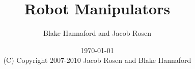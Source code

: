 \documentclass[oneside]{book}
\begin{document}
\setpagewiselinenumbers
\modulolinenumbers[5]

\setcounter{chapter}{0}


 \title{Robot Manipulators}

 \author{Blake Hannaford and Jacob Rosen}

 \date{\today\\(C) Copyright 2007-2010 Jacob Rosen and Blake Hannaford}

 \maketitle

\tableofcontents

\mainmatter

\linenumbers
% 
%
%
%

%  
%  
%  
%  
%  
%  
\setcounter{chapter}{7}
%  
 
% 
%  
% 
% 
% 
% 
% 
%  
% 
% 
% 


% 

%
\label{LastPage}
\end{document}
